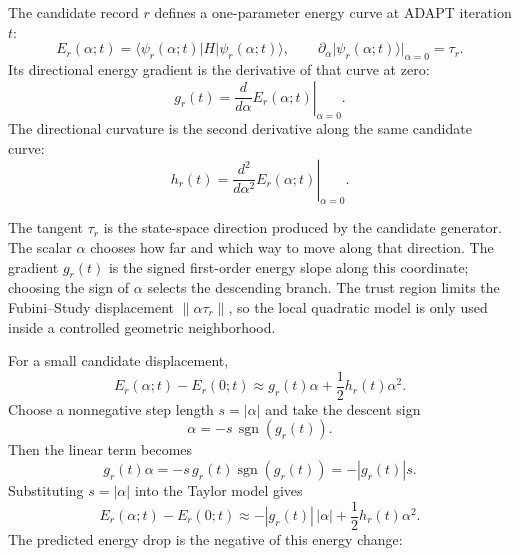 \documentclass[10pt,twocolumn]{article}
\newcommand{\ket}[1]{\lvert #1\rangle}
\newcommand{\bra}[1]{\langle #1\rvert}
\begin{document}
The candidate record \(r\) defines a one-parameter energy curve at ADAPT iteration \(t\):
\begin{equation}
E_r(\alpha;t)
=\bra{\psi_r(\alpha;t)}H\ket{\psi_r(\alpha;t)},
\qquad
\partial_\alpha\ket{\psi_r(\alpha;t)}\big|_{\alpha=0}=\tau_r .
\label{eq:p1_candidate_energy_curve}
\end{equation}
Its directional energy gradient is the derivative of that curve at zero:
\begin{equation}
g_r(t)=
\left.\frac{d}{d\alpha}E_r(\alpha;t)\right|_{\alpha=0}.
\label{eq:p1_gradient_definition}
\end{equation}
The directional curvature is the second derivative along the same candidate curve:
\begin{equation}
h_r(t)=
\left.\frac{d^2}{d\alpha^2}E_r(\alpha;t)\right|_{\alpha=0}.
\label{eq:p1_curvature_definition}
\end{equation}
\begin{intuitionbox}
The tangent \(\tau_r\) is the state-space direction produced by the candidate generator. The scalar \(\alpha\) chooses how far and which way to move along that direction. The gradient \(g_r(t)\) is the signed first-order energy slope along this coordinate; choosing the sign of \(\alpha\) selects the descending branch. The trust region limits the Fubini--Study displacement \(\|\alpha\tau_r\|\), so the local quadratic model is only used inside a controlled geometric neighborhood.
\end{intuitionbox}
For a small candidate displacement,
\begin{equation}
E_r(\alpha;t)-E_r(0;t)
\approx g_r(t)\alpha+\frac12h_r(t)\alpha^2.
\label{eq:p1_taylor_energy}
\end{equation}
Choose a nonnegative step length \(s=|\alpha|\) and take the descent sign
\begin{equation}
\alpha=-s\,\operatorname{sgn}(g_r(t)).
\label{eq:p1_descent_alpha}
\end{equation}
Then the linear term becomes
\begin{equation}
g_r(t)\alpha
=-s\,g_r(t)\operatorname{sgn}(g_r(t))
=-|g_r(t)|s.
\label{eq:p1_linear_descent_sign}
\end{equation}
Substituting \(s=|\alpha|\) into the Taylor model gives
\begin{equation}
E_r(\alpha;t)-E_r(0;t)
\approx
-|g_r(t)|\,|\alpha|+\frac12h_r(t)\alpha^2.
\label{eq:p1_signed_taylor_energy}
\end{equation}
The predicted energy drop is the negative of this energy change:
\end{document}
